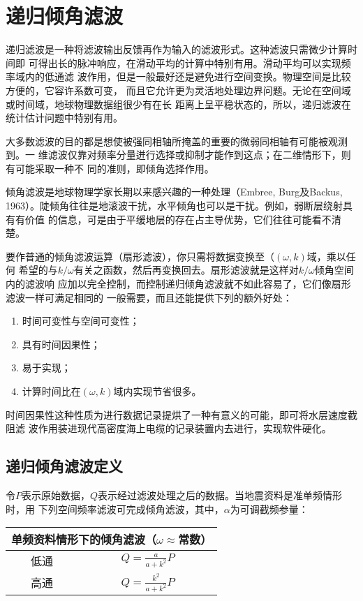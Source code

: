 \section{递归倾角滤波}
\label{sec:2.5}
递归滤波是一种将滤波输出反馈再作为输入的滤波形式。这种滤波只需微少计算时间即
可得出长的脉冲响应，在滑动平均的计算中特别有用。滑动平均可以实现频率域内的低通滤
波作用，但是一般最好还是避免进行空间变换。物理空间是比较方便的，它容许系数可变，
而且它允许更为灵活地处理边界问题。无论在空间域或时间域，地球物理数据组很少有在长
距离上呈平稳状态的，所以，递归滤波在统计估计问题中特别有用。

大多数滤波的目的都是想使被强同相轴所掩盖的重要的微弱同相轴有可能被观测到。一
维滤波仅靠对频率分量迸行选择或抑制才能作到这点；在二维情形下，则有可能采取一种不
同的准则，即倾角选择作用。

倾角滤波是地球物理学家长期以来感兴趣的一种处理（Embree, Burg及Backus,
1963）。陡倾角往往是地滚波干扰，水平倾角也可以是干扰。例如，弱断层绕射具有有价值
的信息，可是由于平缓地层的存在占主导优势，它们往往可能看不清楚。

要作普通的倾角滤波运算（扇形滤波），你只需将数据变换至（$(\omega,k)$域，乘以任何
希望的与$k/\omega$有关之函数，然后再变换回去。扇形滤波就是这样对$k/\omega$倾角空间内的滤波响
应加以完全控制，而控制递归倾角滤波就不如此容易了，它们像扇形滤波一样可满足相同的
一般需要，而且还能提供下列的额外好处：
\begin{enumerate}
\item 时间可变性与空间可变性；
\item
  具有时间因果性；
\item
  易于实现；
\item
  计算时间比在$(\omega,k)$域内实现节省很多。
\end{enumerate}
时间因果性这种性质为进行数据记录提烘了一种有意义的可能，即可将水层速度截阻滤
波作用装进现代高密度海上电缆的记录装置内去进行，实现软件硬化。

\subsection{递归倾角滤波定义}
\label{sec:2.5.1}
令$P$表示原始数据，$Q$表示经过滤波处理之后的数据。当地震资料是准单频情形时，用
下列空间频率滤波可完成倾角滤波，其中，$\alpha$为可调截频参量：

\begin{table}
\centering
\begin{tabular}{|c|c|}
\hline
\multicolumn{2}{|c|}{单频资料情形下的倾角滤波（$\omega\approx$常数）}\\ \hline
低通&$Q=\frac{a}{a+k^2}P$\\ \hline
高通&$Q=\frac{k^2}{a+k^2}P$ \\ \hline
\end{tabular}
\end{table}

